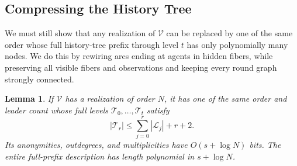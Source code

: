 \documentclass[11pt]{article}
\newtheorem{lemma}{Lemma}
\begin{document}
\subsection{Compressing the History Tree}

We must still show that any realization of \(\mathcal V\) can be
replaced by one of the same order whose full history-tree prefix
through level \(t\) has only polynomially many nodes.
We do this by rewiring arcs ending at agents in hidden fibers,
while preserving all visible fibers and observations and keeping
every round graph strongly connected.

\begin{lemma}
\label{lem:conp-normal-form}
If \(\mathcal V\) has a realization of order \(N\), it has one
of the same order and leader count whose full levels
\(\mathcal T_0,\ldots,\mathcal T_t\) satisfy
\[
 |\mathcal T_r|\leq\sum_{j=0}^r|\mathcal L_j|+r+2.
\]
Its anonymities, outdegrees, and multiplicities have
\(O(s+\log N)\) bits.  The entire full-prefix description has
length polynomial in \(s+\log N\).
\end{lemma}
\end{document}
